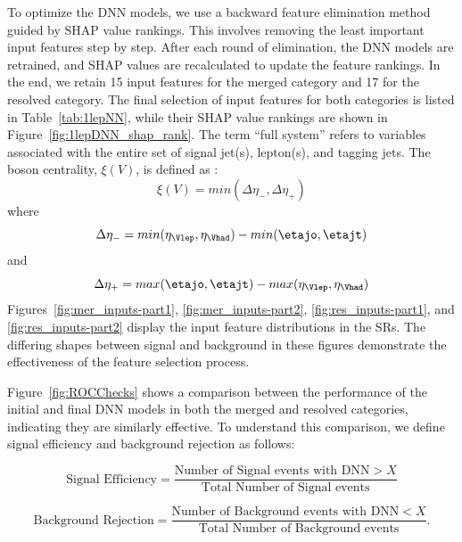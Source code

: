 To optimize the DNN models, we use a backward feature elimination method guided by SHAP value rankings. This involves removing the least important input features step by step. After each round of elimination, the DNN models are retrained, and SHAP values are recalculated to update the feature rankings. In the end, we retain 15 input features for the merged category and 17 for the resolved category.
The final selection of input features for both categories is listed in Table~\ref{tab:1lepNN}, while their SHAP value rankings are shown in Figure~\ref{fig:1lepDNN_shap_rank}.
The term ``full system'' refers to variables associated with the entire set of signal jet(s), lepton(s), and tagging jets.
The boson centrality, $\xi(V)$, is defined as :  
\begin{equation} \label{eq:centr} \xi(V)  = min(\Delta\eta_{-},\Delta\eta_{+}) \end{equation} where $$\Delta\eta_{-} = min(\eta_{\Vlep},\eta_{\Vhad}) - min(\etajo,\etajt)$$ and  $$\Delta\eta_{+} = max(\etajo,\etajt) - max(\eta_{\Vlep},\eta_{\Vhad}) $$
Figures~\ref{fig:mer_inputs-part1}, \ref{fig:mer_inputs-part2}, \ref{fig:res_inputs-part1}, and \ref{fig:res_inputs-part2} display the input feature distributions in the SRs. The differing shapes between signal and background in these figures demonstrate the effectiveness of the feature selection process.

Figure~\ref{fig:ROCChecks} shows a comparison between the performance of the initial and final DNN models in both the merged and resolved categories, indicating they are similarly effective. To understand this comparison, we define signal efficiency and background rejection as follows:

\begin{equation}
\text{Signal Efficiency} = \frac{\text{Number of Signal events with DNN} > X}{\text{Total Number of Signal events}}
\end{equation}

\begin{equation}
\text{Background Rejection} = \frac{\text{Number of Background events with DNN} < X}{\text{Total Number of Background events}}.
\end{equation}


